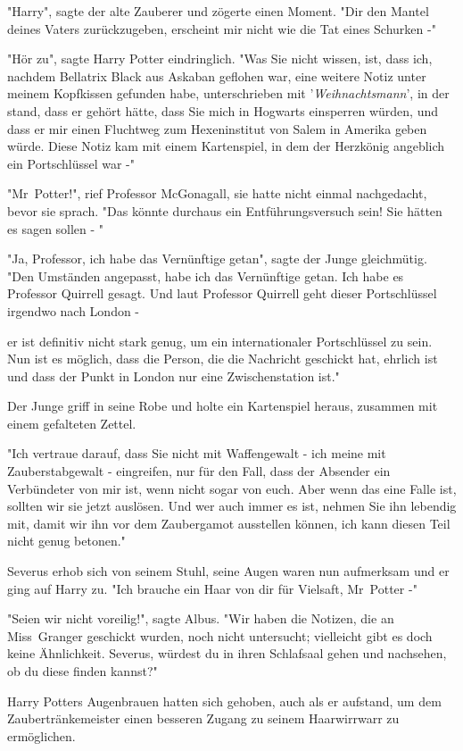 {"Harry", sagte der alte Zauberer und zögerte einen Moment. "Dir den Mantel deines Vaters zurückzugeben, erscheint mir nicht wie die Tat eines Schurken -"

"Hör zu", sagte Harry Potter eindringlich. "Was Sie nicht wissen, ist, dass ich, nachdem Bellatrix Black aus Askaban geflohen war, eine weitere Notiz unter meinem Kopfkissen gefunden habe, unterschrieben mit '\emph{Weihnachtsmann}', in der stand, dass er gehört hätte, dass Sie mich in Hogwarts einsperren würden, und dass er mir einen Fluchtweg zum Hexeninstitut von Salem in Amerika geben würde. Diese Notiz kam mit einem Kartenspiel, in dem der Herzkönig angeblich ein Portschlüssel war -"

"Mr~Potter!", rief Professor McGonagall, sie hatte nicht einmal nachgedacht, bevor sie sprach. "Das könnte durchaus ein Entführungsversuch sein! Sie hätten es sagen sollen - "

"Ja, Professor, ich habe das Vernünftige getan", sagte der Junge gleichmütig. "Den Umständen angepasst, habe ich das Vernünftige getan. Ich habe es Professor Quirrell gesagt. Und laut Professor Quirrell geht dieser Portschlüssel irgendwo nach London -

er ist definitiv nicht stark genug, um ein internationaler Portschlüssel zu sein. Nun ist es möglich, dass die Person, die die Nachricht geschickt hat, ehrlich ist und dass der Punkt in London nur eine Zwischenstation ist."

Der Junge griff in seine Robe und holte ein Kartenspiel heraus, zusammen mit einem gefalteten Zettel.

"Ich vertraue darauf, dass Sie nicht mit Waffengewalt - ich meine mit Zauberstabgewalt - eingreifen, nur für den Fall, dass der Absender ein Verbündeter von mir ist, wenn nicht sogar von euch. Aber wenn das eine Falle ist, sollten wir sie jetzt auslösen. Und wer auch immer es ist, nehmen Sie ihn lebendig mit, damit wir ihn vor dem Zaubergamot ausstellen können, ich kann diesen Teil nicht genug betonen."

Severus erhob sich von seinem Stuhl, seine Augen waren nun aufmerksam und er ging auf Harry zu. "Ich brauche ein Haar von dir für Vielsaft, Mr~Potter -"

"Seien wir nicht voreilig!", sagte Albus. "Wir haben die Notizen, die an Miss~Granger geschickt wurden, noch nicht untersucht; vielleicht gibt es doch keine Ähnlichkeit. Severus, würdest du in ihren Schlafsaal gehen und nachsehen, ob du diese finden kannst?"

Harry Potters Augenbrauen hatten sich gehoben, auch als er aufstand, um dem Zaubertränkemeister einen besseren Zugang zu seinem Haarwirrwarr zu ermöglichen.

}
